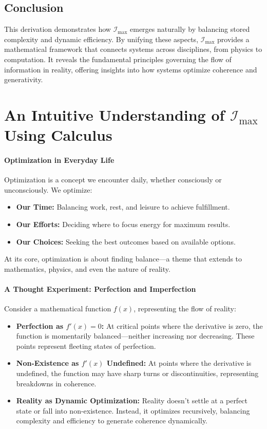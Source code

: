 \documentclass[12pt]{article}
\begin{document}
\subsection{Conclusion}
This derivation demonstrates how \(\mathcal{I}_{\text{max}}\) emerges naturally by balancing stored complexity and dynamic efficiency. By unifying these aspects, \(\mathcal{I}_{\text{max}}\) provides a mathematical framework that connects systems across disciplines, from physics to computation. It reveals the fundamental principles governing the flow of information in reality, offering insights into how systems optimize coherence and generativity.


\section{An Intuitive Understanding of \(\mathcal{I}_{\text{max}}\) Using Calculus}

\paragraph{Optimization in Everyday Life}
Optimization is a concept we encounter daily, whether consciously or unconsciously. We optimize:
\begin{itemize}
    \item \textbf{Our Time:} Balancing work, rest, and leisure to achieve fulfillment.
    \item \textbf{Our Efforts:} Deciding where to focus energy for maximum results.
    \item \textbf{Our Choices:} Seeking the best outcomes based on available options.
\end{itemize}
At its core, optimization is about finding balance—a theme that extends to mathematics, physics, and even the nature of reality.

\paragraph{A Thought Experiment: Perfection and Imperfection}
Consider a mathematical function \( f(x) \), representing the flow of reality:
\begin{itemize}
    \item \textbf{Perfection as \( f'(x) = 0 \):}  
    At critical points where the derivative is zero, the function is momentarily balanced—neither increasing nor decreasing. These points represent fleeting states of perfection.
    \item \textbf{Non-Existence as \( f'(x) \) Undefined:}  
    At points where the derivative is undefined, the function may have sharp turns or discontinuities, representing breakdowns in coherence.
    \item \textbf{Reality as Dynamic Optimization:}  
    Reality doesn’t settle at a perfect state or fall into non-existence. Instead, it optimizes recursively, balancing complexity and efficiency to generate coherence dynamically.
\end{itemize}
\end{document}
